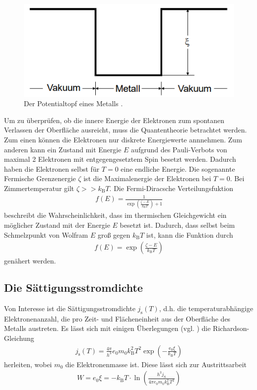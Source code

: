 \begin{figure}[H]
    \centering
    \includegraphics[height = 3 cm]{Abbildungen/potentialtopf_metall.png}
    \caption{Der Potentialtopf eines Metalls \cite[]{man:v504}.}
    \label{fig:potentialtopf_metall}
\end{figure}


\noindent
Um zu überprüfen, ob die innere Energie der Elektronen zum spontanen Verlassen der Oberfläche ausreicht, muss die Quantentheorie betrachtet werden.
Zum einen können die Elektronen nur diskrete Energiewerte annnehmen.
Zum anderen kann ein Zustand mit Energie $E$ aufgrund des Pauli-Verbots von maximal 2 Elektronen mit entgegengesetztem Spin besetzt werden.
Dadurch haben die Elektronen selbst für $T = 0$ eine endliche Energie. 
Die sogenannte Fermische Grenzenergie $\zeta$ ist die Maximalenergie der Elektronen bei $T = 0$.
Bei Zimmertemperatur gilt $\zeta >> k_\text{B} T$.
Die Fermi-Diracsche Verteilungsfuktion 
\begin{align}
    f(E) = \frac{1}{\exp\left(\frac{\zeta - E}{k_\text{B} T}\right) + 1}
    \label{eq:fermi_dirac}
\end{align}
beschreibt die Wahrscheinlichkeit, dass im thermischen Gleichgewicht ein möglicher Zustand mit der Energie $E$ besetzt ist.
Dadurch, dass selbst beim Schmelzpunkt von Wolfram $E$ groß gegen $k_\text{B} T$ ist, kann die Funktion durch
\begin{align}
    f(E) = \exp\left(\frac{\zeta - E}{k_\text{B} T}\right)
    \label{eq:energieverteilung}
\end{align}
genähert werden.




\subsection{Die Sättigungsstromdichte}
Von Interesse ist die Sättigungsstromdichte $j_\text{s}(T)$, d.h. die temperaturabhängige Elektronenanzahl, die pro Zeit- und Flächeneinheit aus der Oberfläche 
des Metalls austreten.
Es lässt sich mit einigen Überlegungen (vgl. \cite{man:v504}) die Richardson-Gleichung
\begin{align}
    j_\text{s}(T) = \frac{4 \pi}{h^3} e_0 m_0 k_\text{B}^2 T^2 \exp\left(- \frac{\text{e}_0 \xi}{k_\text{B} T}\right)
    \label{eq:richardson}
\end{align}
herleiten, wobei $m_0$ die Elektronenmasse ist.
Diese lässt sich zur Austrittsarbeit 
\begin{align}
    W = e_0 \xi = - k_\text{B} T \cdot \ln\left(\frac{h^3 j_\text{S}}{4 \pi e_0 m_0 k_\text{B}^2 T^2}\right)
    \label{eq:austritt_richardson}
\end{align}




